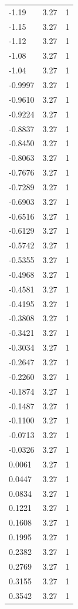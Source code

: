 \begin{longtable}{lrr}
  -1.19 & 3.27 & 1 \\
  -1.15 & 3.27 & 1 \\
  -1.12 & 3.27 & 1 \\
  -1.08 & 3.27 & 1 \\
  -1.04 & 3.27 & 1 \\
  -0.9997 & 3.27 & 1 \\
  -0.9610 & 3.27 & 1 \\
  -0.9224 & 3.27 & 1 \\
  -0.8837 & 3.27 & 1 \\
  -0.8450 & 3.27 & 1 \\
  -0.8063 & 3.27 & 1 \\
  -0.7676 & 3.27 & 1 \\
  -0.7289 & 3.27 & 1 \\
  -0.6903 & 3.27 & 1 \\
  -0.6516 & 3.27 & 1 \\
  -0.6129 & 3.27 & 1 \\
  -0.5742 & 3.27 & 1 \\
  -0.5355 & 3.27 & 1 \\
  -0.4968 & 3.27 & 1 \\
  -0.4581 & 3.27 & 1 \\
  -0.4195 & 3.27 & 1 \\
  -0.3808 & 3.27 & 1 \\
  -0.3421 & 3.27 & 1 \\
  -0.3034 & 3.27 & 1 \\
  -0.2647 & 3.27 & 1 \\
  -0.2260 & 3.27 & 1 \\
  -0.1874 & 3.27 & 1 \\
  -0.1487 & 3.27 & 1 \\
  -0.1100 & 3.27 & 1 \\
  -0.0713 & 3.27 & 1 \\
  -0.0326 & 3.27 & 1 \\
  0.0061 & 3.27 & 1 \\
  0.0447 & 3.27 & 1 \\
  0.0834 & 3.27 & 1 \\
  0.1221 & 3.27 & 1 \\
  0.1608 & 3.27 & 1 \\
  0.1995 & 3.27 & 1 \\
  0.2382 & 3.27 & 1 \\
  0.2769 & 3.27 & 1 \\
  0.3155 & 3.27 & 1 \\
  0.3542 & 3.27 & 1 \\

\end{longtable}
